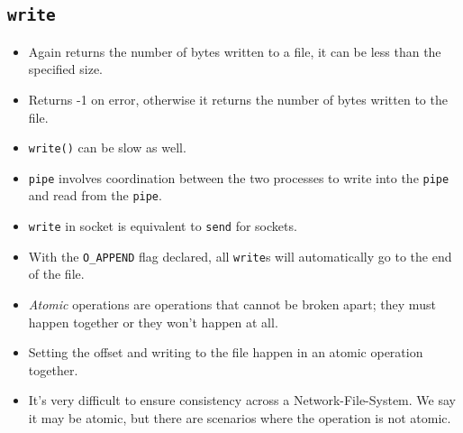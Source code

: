 \documentclass[]{article}
\newcommand{\code}{\texttt}
\begin{document}
\subsection{\code{write}}
\begin{itemize}
\item Again returns the number of bytes written to a file, it can be less than
the specified size.
\item Returns -1 on error, otherwise it returns the number of bytes written to
the file.
\item \code{write()} can be slow as well.
\item \code{pipe} involves coordination between the two processes to write into
the \code{pipe} and read from the \code{pipe}.
\item \code{write} in socket is equivalent to \code{send} for sockets.
\item With the \code{O\_APPEND} flag declared, all \code{write}s will
automatically go to the end of the file.
\item \emph{Atomic} operations are operations that cannot be broken apart; they
must happen together or they won't happen at all.
\item Setting the offset and writing to the file happen in an atomic operation
together.
\item It's very difficult to ensure consistency across a Network-File-System. We
say it may be atomic, but there are scenarios where the operation is not atomic.
\end{itemize}
\end{document}
